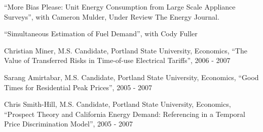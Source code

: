 \documentclass[Computer Science]{vita}
\begin{document}
\begin{vita}
\begin{Selected Publications}
\begin{Unrefereed Public Reports}
    \end{Unrefereed Public Reports}

\begin{Working Papers}

\item ``More Bias Please: Unit Energy Consumption from Large Scale Appliance Surveys'', with Cameron Mulder, Under Review The Energy Journal.

\item ``Simultaneous Estimation of Fuel Demand'', with Cody Fuller
 
\end{Working Papers}

  \end{Selected Publications}


  \begin{Instructional Activities}






    \begin{M.S. Project Adviser}

    \item Christian Miner, M.S. Candidate, Portland State University,
      Economics, ``The Value of Transferred Risks in Time-of-use
      Electrical Tariffs'', 2006 - 2007

    \item Sarang Amirtabar, M.S. Candidate, Portland State University,
      Economics, ``Good Times for Residential Peak Prices'', 2005 -
      2007

    \item Chris Smith-Hill, M.S. Candidate, Portland State University,
      Economics, ``Prospect Theory and California Energy Demand:
      Referencing in a Temporal Price Discrimination Model'', 2005 -
      2007
    \end{M.S. Project Adviser}


\end{Instructional Activities}
\end{vita}
\end{document}
